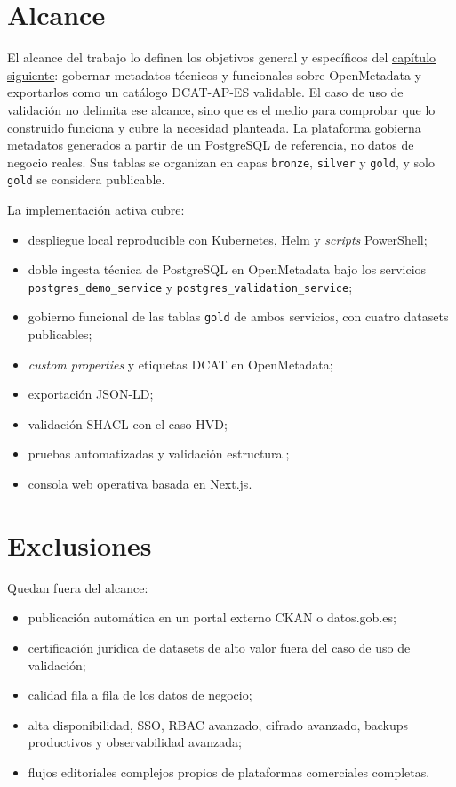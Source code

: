 \section{Alcance}

El alcance del trabajo lo definen los objetivos general y específicos del \hyperref[cap:objetivos]{capítulo siguiente}: gobernar metadatos técnicos y funcionales sobre OpenMetadata y exportarlos como un catálogo DCAT-AP-ES validable. El caso de uso de validación no delimita ese alcance, sino que es el medio para comprobar que lo construido funciona y cubre la necesidad planteada. La plataforma gobierna metadatos generados a partir de un PostgreSQL de referencia, no datos de negocio reales. Sus tablas se organizan en capas \texttt{bronze}, \texttt{silver} y \texttt{gold}, y solo \texttt{gold} se considera publicable.

La implementación activa cubre:

\begin{itemize}
  \item despliegue local reproducible con Kubernetes, Helm y \emph{scripts} PowerShell;
  \item doble ingesta técnica de PostgreSQL en OpenMetadata bajo los servicios \texttt{postgres\_demo\_service} y \texttt{postgres\_validation\_service};
  \item gobierno funcional de las tablas \texttt{gold} de ambos servicios, con cuatro datasets publicables;
  \item \emph{custom properties} y etiquetas DCAT en OpenMetadata;
  \item exportación JSON-LD;
  \item validación SHACL con el caso HVD;
  \item pruebas automatizadas y validación estructural;
  \item consola web operativa basada en Next.js.
\end{itemize}

\section{Exclusiones}

Quedan fuera del alcance:

\begin{itemize}
  \item publicación automática en un portal externo CKAN o datos.gob.es;
  \item certificación jurídica de datasets de alto valor fuera del caso de uso de validación;
  \item calidad fila a fila de los datos de negocio;
  \item alta disponibilidad, SSO, RBAC avanzado, cifrado avanzado, backups productivos y observabilidad avanzada;
  \item flujos editoriales complejos propios de plataformas comerciales completas.
\end{itemize}

